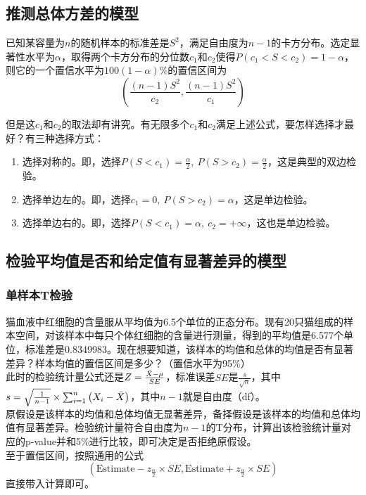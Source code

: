 \documentclass[UTF8]{ctexart}
\begin{document}
\subsection{推测总体方差的模型}
已知某容量为$n$的随机样本的标准差是$S^2$，满足自由度为$n-1$的卡方分布。选定显著性水平为$\alpha$，取得两个卡方分布的分位数$c_1$和$c_2$使得$P(c_1<S<c_2)=1-\alpha$，则它的一个置信水平为$100(1-\alpha)\%$的置信区间为
\[
	\left(\frac{(n-1)S^2}{c_2},\frac{(n-1)S^2}{c_1}\right)
\]

但是这$c_1$和$c_2$的取法却有讲究。有无限多个$c_1$和$c_2$满足上述公式，要怎样选择才最好？有三种选择方式：

\begin{enumerate}
  \item 选择对称的。即，选择$P(S<c_1)=\frac{\alpha}{2},\ P(S>c_2)=\frac{\alpha}{2}$，这是典型的双边检验。
  \item 选择单边左的。即，选择$c_1=0,\ P(S>c_2)=\alpha$，这是单边检验。
  \item 选择单边右的。即，选择$P(S<c_1)=\alpha,\ c_2=+\infty$，这也是单边检验。
\end{enumerate}

\subsection{检验平均值是否和给定值有显著差异的模型}
\subsubsection{单样本T检验}
猫血液中红细胞的含量服从平均值为6.5个单位的正态分布。现有20只猫组成的样本空间，对该样本中每只个体红细胞的含量进行测量，得到的平均值是6.577个单位，标准差是0.8349983。现在想要知道，该样本的均值和总体的均值是否有显著差异？样本均值的置信区间是多少？（置信水平为95\%）\\
\indent 此时的检验统计量公式还是$Z=\frac{\Bar{X}-\mu}{SE}$，标准误差$SE$是$\frac{s}{\sqrt{n}}$，其中$s=\sqrt{\frac{1}{n-1}}\times \sum_{i=1}^n\left(X_i-\Bar{X}\right)$，其中$n-1$就是自由度（df）。\\
\indent 原假设是该样本的均值和总体均值无显著差异，备择假设是该样本的均值和总体均值有显著差异。检验统计量符合自由度为$n-1$的T分布，计算出该检验统计量对应的p-value并和5\%进行比较，即可决定是否拒绝原假设。\\
\indent 至于置信区间，按照通用的公式
\[
\left(\text{Estimate}-z_{\frac{\alpha}{2}}\times SE,\text{Estimate}+z_{\frac{\alpha}{2}}\times SE\right)
\]
直接带入计算即可。
\end{document}

